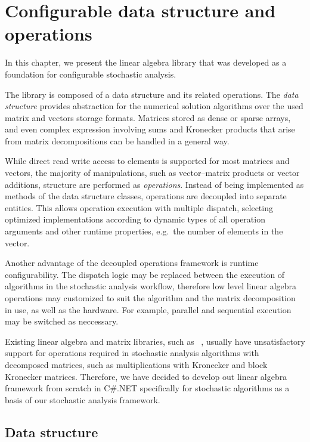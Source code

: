\chapter{Configurable data structure and operations}
\label{chap:operations}

In this chapter, we present the linear algebra library that was
developed as a foundation for configurable stochastic analysis.

The library is composed of a data structure and its related
operations. The \emph{data structure} provides abstraction for the
numerical solution algorithms over the used matrix and vectors storage
formats. Matrices stored as dense or sparse arrays, and even complex
expression involving sums and Kronecker products that arise from
matrix decompositions can be handled in a general way.

While direct read write access to elements is supported for most
matrices and vectors, the majority of manipulations, such as
vector--matrix products or vector additions, structure are performed
as \emph{operations}. Instead of being implemented as methods of the
data structure classes, operations are decoupled into separate
entities. This allows operation execution with multiple dispatch,
selecting optimized implementations according to dynamic types of all
operation arguments and other runtime properties, e.g.~the number of
elements in the vector.

Another advantage of the decoupled operations framework is runtime
configurability. The dispatch logic may be replaced between the
execution of algorithms in the stochastic analysis workflow, therefore
low level linear algebra operations may customized to suit the
algorithm and the matrix decomposition in use, as well as the
hardware. For example, parallel and sequential execution may be
switched as neccessary.

Existing linear algebra and matrix libraries, such as%
~\citep{mathdotnet,bluebit,extremeopt,eigen,sanderson2010armadillo},
usually have unsatisfactory support for operations required in
stochastic analysis algorithms with decomposed matrices, such as
multiplications with Kronecker and block Kronecker
matrices. Therefore, we have decided to develop out linear algebra
framework from scratch in C\#.NET specifically for stochastic
algorithms as a basis of our stochastic analysis framework.

\section{Data structure}

